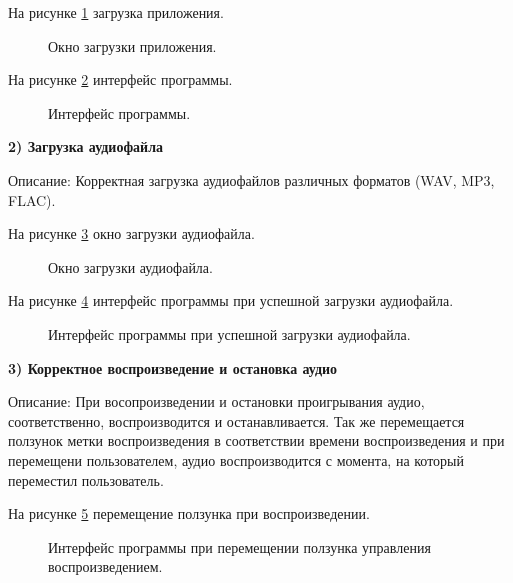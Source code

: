 На рисунке \ref{LoadingWind:image} загрузка приложения.

\begin{figure}[ht]
	\caption{Окно загрузки приложения.}
	\label{LoadingWind:image}
\end{figure}

На рисунке \ref{Interface:image} интерфейс программы.

\begin{figure}[ht]
	\caption{Интерфейс программы.}
	\label{Interface:image}
\end{figure}
\clearpage

\textbf{2) Загрузка аудиофайла}

Описание: Корректная загрузка аудиофайлов различных форматов (WAV, MP3, FLAC).

На рисунке \ref{LoadWindow:image} окно загрузки аудиофайла.

\begin{figure}[ht]
	\caption{Окно загрузки аудиофайла.}
	\label{LoadWindow:image}
\end{figure}

На рисунке \ref{InterLoad:image} интерфейс программы при успешной загрузки аудиофайла.

\begin{figure}[ht]
	\caption{Интерфейс программы при успешной загрузки аудиофайла.}
	\label{InterLoad:image}
\end{figure}
\clearpage

\textbf{3) Корректное воспроизведение и остановка аудио}

Описание: При восопроизведении и остановки проигрывания аудио, соответственно, воспроизводится и останавливается. Так же перемещается ползунок метки воспроизведения в соответствии времени воспроизведения и при перемещени пользователем, аудио воспроизводится с момента, на который переместил пользователь.

На рисунке \ref{SliderTime:image} перемещение ползунка при воспроизведении.

\begin{figure}[ht]
	\caption{Интерфейс программы при перемещении ползунка управления воспроизведением.}
	\label{SliderTime:image}
\end{figure}

